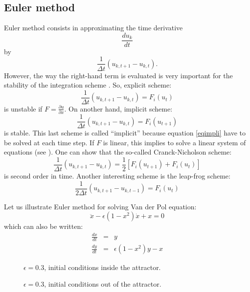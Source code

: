 \documentclass[12pt]{book}
\begin{document}
\subsection{Euler method}
Euler method consists in approximating the time derivative
\begin{equation}
\frac{du_k}{dt}
\end{equation}
by
\begin{equation}
\frac{1}{\Delta t}(u_{k,t+1}-u_{k,t}).
\end{equation}
However, the way the right-hand term is evaluated is very important for the
stability of the integration scheme
\cite{ma:compu:Press92}. So, explicit scheme:
\begin{equation}
\frac{1}{\Delta t}(u_{k,t+1}-u_{k,t})=F_i(u_t)
\end{equation}
is unstable if $F=\frac{\partial u}{\partial x}$. On another hand, implicit
scheme:
\begin{equation}\label{eqimpli}
\frac{1}{\Delta t}(u_{k,t+1}-u_{k,t})=F_i(u_{t+1})
\end{equation}
is stable. This last scheme is called ``implicit'' because 
equation \ref{eqimpli} have to be solved at each time step. If $F$ is linear,
this implies to solve a linear system of equations (see
\cite{ma:compu:Press92}). 
One can show that the so-called Cranck-Nicholson scheme:
\begin{equation}
\frac{1}{\Delta t}(u_{k,t+1}-u_{k,t})
= \frac{1}{2}[F_i(u_{t+1})+F_i(u_{t})] 
\end{equation} 
is second order in time.
Another interesting scheme is the leap-frog scheme:
\begin{equation}
\frac{1}{2\Delta t}(u_{k,t+1}-u_{k,t-1})
=F_i(u_{t}) 
\end{equation} 
\begin{exmp}
Let us illustrate Euler method for solving Van der Pol equation:
\begin{equation}
\ddot{x}-\epsilon(1-x^2)\dot{x}+x=0
\end{equation}
which can also be written:
\begin{eqnarray}
\frac{dx}{dt}&=&y\\
\frac{dy}{dt}&=&\epsilon (1-x^2)y-x
\end{eqnarray}
\begin{figure}[htb]
 \centerline{}   
 \caption{$\epsilon=0.3$, initial conditions inside the attractor.}
 \label{figpol03i}
\end{figure}
\begin{figure}[htb]
 \centerline{}   
 \caption{$\epsilon=0.3$, initial conditions out of the attractor.}
 \label{figpol03e}
\end{figure}
%
\end{exmp}
\end{document}
